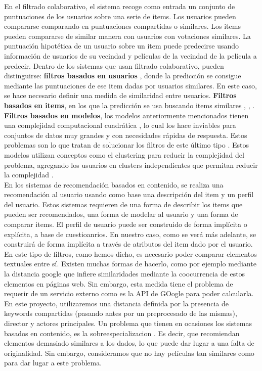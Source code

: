 En el filtrado colaborativo, el sistema recoge como entrada un conjunto de puntuaciones de los usuarios sobre una serie de items. Los usuarios pueden compararse comparando en puntuaciones compartidas o similares. Los items pueden compararse de similar manera con usuarios con votaciones similares. La puntuación hipotética de un usuario sobre un item puede predecirse usando información de usuarios de su vecindad y películas de la vecindad de la película a predecir. Dentro de los sistemas que usan filtrado colaborativo, pueden distinguirse: \textbf{filtros basados en usuarios} \cite{resnick}, donde la predicción se consigue mediante las puntuaciones de ese item dadas por usuarios similares. En este caso, se hace necesario definir una medida de similaridad entre usuarios. \textbf{Filtros basados en items}, en los que la predicción se usa buscando items similares \cite{Amazon}, \cite{sarwar}, \cite{karypis}. \textbf{Filtros basados en modelos}, los modelos anteriormente mencionados tienen una complejidad computacional cuadrática \cite{Candiller}, lo cual los hace inviables para conjuntos de datos muy grandes y con necesidades rápidas de respuesta. Estos problemas son lo que tratan de solucionar los filtros de este último tipo \cite{breese}. Estos modelos utilizan conceptos como el clustering para reducir la complejidad del problema, agregando los usuarios en clusters independientes que permitan reducir la complejidad \cite{oconnor}.\\

En los sistemas de recomendación basados en contenido, se realiza una recomendación al usuario usando como base una descripción del item y un perfil del usuario. Estos sistemas requieren de una forma de describir los items que pueden ser recomendados, una forma de modelar al usuario y una forma de comparar items. El perfil de usuario puede ser construido de forma implícita o explícita, a base de cuestioanrios. En nuestro caso, como se verá más adelante, se construirá de forma implícita a través de atributos del item dado por el usuario. En este tipo de filtros, como hemos dicho, es necesario poder comparar elementos textuales entre sí. Existen muchas formas de hacerlo, como por ejemplo mediante la distancia google \cite{cilibrasi} que infiere similaridades mediante la coocurrencia de estos elementos en páginas web. Sin embargo, esta medida tiene el problema de requerir de un servicio externo como es la API de GOogle para poder calcularla. En este proyecto, utilizaremos una distancia definida por la presencia de keywords compartidas (pasando antes por un preprocesado de las mismas), director y actores principales. Un problema que tienen en ocasiones los sistemas basados en contenido, es la sobreespecializacion \cite{zhang}. Es decir, que recomiendan elementos demasiado similares a los dados, lo que puede dar lugar a una falta de originalidad. Sin embargo, consideramos que no hay películas tan similares como para dar lugar a este problema.\\

